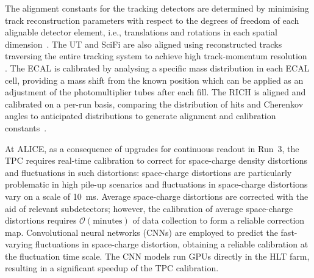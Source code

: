The alignment constants for the tracking detectors are determined by minimising track reconstruction parameters with respect to the degrees of freedom of each alignable detector element, i.e., translations and rotations in each spatial dimension~\cite{LHCb:wouter-kf}. The UT and SciFi are also aligned using reconstructed tracks traversing the entire tracking system to achieve high track-momentum resolution \cite{Reiss:2846414}. The ECAL is calibrated by analysing a specific mass distribution in each ECAL cell, providing a mass shift from the known position which can be applied as an adjustment of the photomultiplier tubes after each fill. The RICH is aligned and calibrated on a per-run basis, comparing the distribution of hits and Cherenkov angles to anticipated distributions to generate alignment and calibration constants~\cite{LHCb:RICH_AlignCalib}.

At ALICE, as a consequence of upgrades for continuous readout in Run~3, the TPC requires real-time calibration to correct for space-charge density distortions and fluctuations in such distortions: space-charge distortions are particularly problematic in high pile-up scenarios and fluctuations in space-charge distortions vary on a scale of \SI{10}{\milli\second}. Average space-charge distortions are corrected with the aid of relevant subdetectors; however, the calibration of average space-charge distortions requires $\mathcal{O}\left(\mathrm{minutes}\right)$ of data collection to form a reliable correction map. Convolutional neural networks (CNNs) are employed to predict the fast-varying fluctuations in space-charge distortion, obtaining a reliable calibration at the fluctuation time scale. The CNN models run GPUs directly in the HLT farm, resulting in a significant speedup of the TPC calibration.

